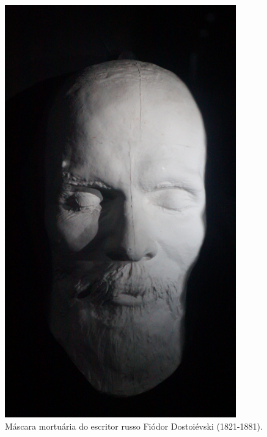 \movetoevenpage
\begin{absolutelynopagebreak}
\begin{vplace}
\begin{figure}[H]
\begin{adjustwidth}{-2.7cm}{}
  \vspace{-1.8cm}
  \hspace{2.2cm}
  \includegraphics[angle=270,width=100mm]{./imgs/petersburgo2.jpg}  
\end{adjustwidth}
  \caption{Máscara mortuária do escritor russo Fiódor Dostoiévski (1821-1881).}

\thispagestyle{empty}

\end{figure}
\end{vplace}

\end{absolutelynopagebreak}

\movetooddpage
{}
